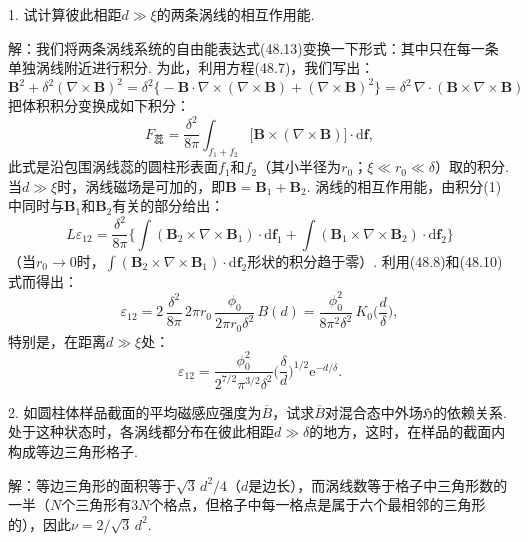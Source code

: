 \begin{xiti}

1. 试计算彼此相距$d\gg\xi$的两条涡线的相互作用能.

{\heiti 解：}我们将两条涡线系统的自由能表达式(48.13)变换一下形式：其中只在每一条单独涡线附近进行积分. 为此，利用方程(48.7)，我们写出：
\begin{equation*}
\bm{B}^2+\delta^2(\nabla\times\bm{B})^2
=\delta^2\bigl\{-\bm{B}\cdot\nabla\times(\nabla\times\bm{B})+(\nabla\times\bm{B})^2\bigr\}
=\delta^2\,\nabla\cdot(\bm{B}\times\nabla\times\bm{B})
\end{equation*}
把体积积分变换成如下积分：
\begin{equation}\tag{1}
F_{\text{蕊}}=\frac{\delta^2}{8\pi}\int_{f_1+f_2}
\bigl[\bm{B}\times(\nabla\times\bm{B})\bigr]\cdot\mathrm{d}\bm{f},
\end{equation}
此式是沿包围涡线蕊的圆柱形表面$f_1$和$f_2$（其小半径为$r_0$；$\xi\ll r_0\ll\delta$）取的积分. 当$d\gg\xi$时，涡线磁场是可加的，即$\bm{B}=\bm{B}_1+\bm{B}_2$. 涡线的相互作用能，由积分(1)中同时与$\bm{B}_1$和$\bm{B}_2$有关的部分给出：
\begin{equation*}
L\varepsilon_{12}=\frac{\delta^2}{8\pi}
\biggl\{\int(\bm{B}_2\times\nabla\times\bm{B}_1)\cdot\mathrm{d}\bm{f}_1
+\int(\bm{B}_1\times\nabla\times\bm{B}_2)\cdot\mathrm{d}\bm{f}_2\biggr\}
\end{equation*}
（当$r_0\to0$时，$\int(\bm{B}_2\times\nabla\times\bm{B}_1)\cdot\mathrm{d}\bm{f}_2$形状的积分趋于零）. 利用(48.8)和(48.10)式而得出：
\begin{equation*}
\varepsilon_{12}=2\,\frac{\delta^2}{8\pi}\,2\pi r_0\,\frac{\phi_0}{2\pi r_0\delta^2}\,B(d)
=\frac{\phi_0^2}{8\pi^2\delta^2}\,K_0\biggl(\frac{d}{\delta}\biggr),
\end{equation*}
特别是，在距离$d\gg\xi$处：
\begin{equation}\tag{2}
\varepsilon_{12}=\frac{\phi_0^2}{2^{7/2}\pi^{3/2}\delta^2}
\biggl(\frac{\delta}{d}\biggr)^{\!1/2}\mathrm{e}^{-d/\delta}.
\end{equation}

2. 如圆柱体样品截面的平均磁感应强度为$\overline{B}$，试求$\overline{B}$对混合态中外场$\mathfrak{H}$的依赖关系. 处于这种状态时，各涡线都分布在彼此相距$d\gg\delta$的地方，这时，在样品的截面内构成等边三角形格子.

{\heiti 解：}等边三角形的面积等于$\sqrt{3}\,d^2/4$（$d$是边长），而涡线数等于格子中三角形数的一半（$N$个三角形有$3N$个格点，但格子中每一格点是属于六个最相邻的三角形的），因此$\nu=2/\sqrt{3}\,d^2$.


\end{xiti}
